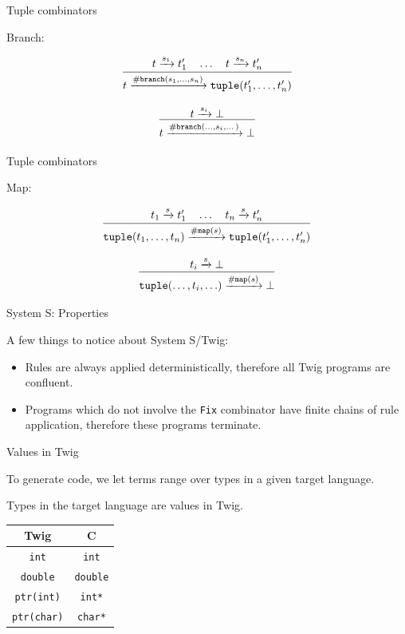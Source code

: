 \documentclass{beamer}
\newcommand{\arr}[1]{\ensuremath\xrightarrow{#1}}
\begin{document}
\begin{frame}{Tuple combinators}

Branch:

\[
\infer{
  t \arr{\mathtt{\#branch}(s_1,\ldots,s_n)}
  \mathtt{tuple}(t_1',\ldots,t_n')
}{t \arr{s_1} t_1' \quad \ldots \quad t \arr{s_n} t_n'}
\]

\[
\infer
{t \arr{\mathtt{\#branch}(\ldots,s_i,\dots)} \bot}
{t \arr{s_i} \bot}
\]

\end{frame}


\begin{frame}{Tuple combinators}

Map:

\[
\infer{
  \mathtt{tuple}(t_1,\ldots,t_n)
  \arr{\mathtt{\#map}(s)}
  \mathtt{tuple}(t_1',\ldots,t_n')
}{t_1 \arr{s} t_1' \quad \ldots \quad t_n \arr{s} t_n'}
\]

\[
\infer
{\mathtt{tuple}(\ldots,t_i,\ldots) \arr{\mathtt{\#map}(s)} \bot}
{t_i \arr{s} \bot}
\]

\end{frame}


\begin{frame}{System S: Properties}

A few things to notice about System S/Twig:

\begin{itemize}

\item Rules are always applied deterministically, therefore all Twig programs
are confluent.

\item Programs which do not involve the \texttt{Fix} combinator have finite
chains of rule application, therefore these programs terminate.

\end{itemize}

\end{frame}


\begin{frame}{Values in Twig}

To generate code, we let terms range over types in a given target language.

Types in the target language are values in Twig.

\begin{center}
\begin{tabular}{c | c}
  Twig               & C \\
  \hline                       
  \texttt{int}       & \texttt{int}    \\
  \texttt{double}    & \texttt{double} \\
  \texttt{ptr(int)}  & \texttt{int*}   \\
  \texttt{ptr(char)} & \texttt{char*}  \\
\end{tabular}
\end{center}

\end{frame}
\end{document}
